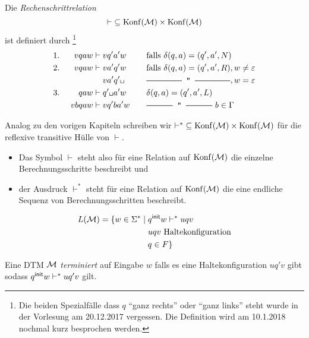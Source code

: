 \begin{Def}[name={[Rechenschrittrelation]}] %
	Die \emph{Rechenschrittrelation}
	\[ {\vdash} \subseteq \operatorname{Konf}(\mathcal{M})\times\operatorname{Konf}(\mathcal{M}) \]
	ist definiert durch
	\footnote{Die beiden Spezialfälle dass $q$ ``ganz rechts'' oder ``ganz links'' steht wurde in der Vorlesung am 20.12.2017 vergessen. Die Definition wird am 10.1.2018 nochmal kurz besprochen werden.}
	\begin{alignat*}{3}
		1.&\ & v qaw &\vdash v q'a'w &\quad& \text{falls }\delta(q,a)=(q',a',N)\\
		2.&& v qaw &\vdash v a'q'w && \text{falls }\delta(q,a)=(q',a',R), w\neq \Eps\\
		&&&\phantom{{}\vdash{}} v a'q'\blank && \ruleplaceholder{\widthof{falls $\delta(q,a)=(q',a',R)$}}, w=\Eps\\
		3.&& qaw &\vdash q'\blank a'w && \delta(q,a)=(q',a',L)\\
		&& vbqaw &\vdash vq'ba'w && \ruleplaceholder{\widthof{$\delta(q,a)=(q',a',L)$}}\  b\in\Gamma
	\end{alignat*}
\end{Def}
Analog zu den vorigen Kapiteln schreiben wir
	${\vdash^*} \subseteq \operatorname{Konf}(\mathcal{M}) \times \operatorname{Konf}(\mathcal{M})$ 
	für die reflexive transitive Hülle von $\vdash$.
\begin{itemize}
 \item Das Symbol $\vdash$ steht also für eine Relation auf $\operatorname{Konf}(\mathcal{M})$ die einzelne Berechnungsschritte beschreibt und
 \item der Ausdruck $\vdash^*$ steht für eine Relation auf $\operatorname{Konf}(\mathcal{M})$ die eine endliche Sequenz von  Berechnungsschritten beschreibt.
\end{itemize}

 
%
%
\begin{Def} %
	\begin{align*}
		L(\mathcal{M})=\{ w\in\Sigma^* \mid{}
		& q^\mathsf{init} w \vdash^*uqv\\
		&uqv \text{ Haltekonfiguration}\\
		&q\in F\}
	\end{align*}
\end{Def}


\begin{Def}[name={[Terminierung]}]
 Eine \ac{DTM} $\mathcal{M}$ \emph{terminiert} auf Eingabe $w$ 
 falls es eine Haltekonfiguration $uq'v$ gibt sodass $q^\mathsf{init} w\vdash^*uq'v$ gilt.
\end{Def}


